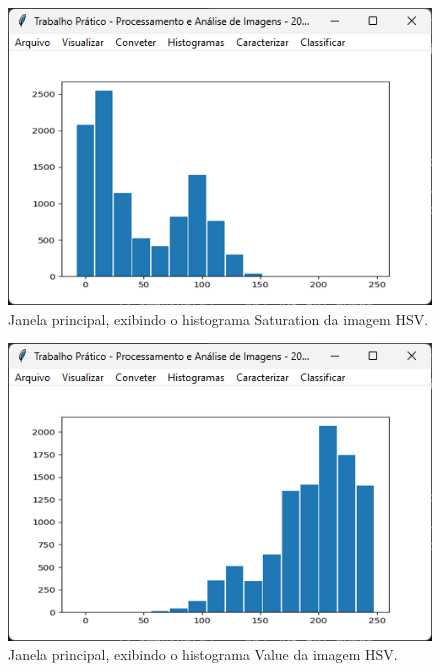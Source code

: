 \documentclass[12pt]{article}
\begin{document}
\begin{figure}
    \centering
    \includegraphics{Captura de tela 2024-06-10 095002.png}
    \caption{Janela principal, exibindo o histograma Saturation da imagem HSV.}
    \label{fig:janela-principal-histograma-saturation}
\end{figure}

\begin{figure}
    \centering
    \includegraphics{Captura de tela 2024-06-10 095102.png}
    \caption{Janela principal, exibindo o histograma Value da imagem HSV.}
    \label{fig:janela-principal-histograma-value}
\end{figure}
\end{document}
